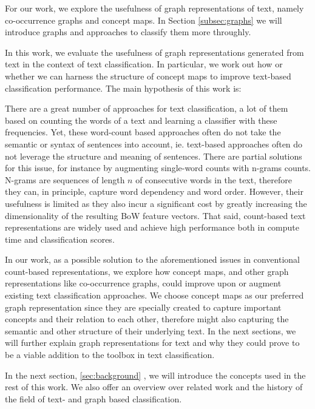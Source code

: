For our work, we explore the usefulness of graph representations of text, namely co-occurrence graphs and concept maps.
In Section \ref{subsec:graphs} we will introduce graphs and approaches to classify them more throughly.

In this work, we evaluate the usefulness of graph representations generated from text in the context of text classification. In particular, we work out how or whether we can harness the structure of concept maps to improve text-based classification performance.
The main hypothesis of this work is:
\begin{quote}
\hypothesis
\end{quote}

There are a great number of approaches for text classification, a lot of them based on counting the words of a text and learning a classifier with these frequencies.
Yet, these word-count based approaches often do not take the semantic or syntax of sentences into account, ie. text-based approaches often do not leverage the structure and meaning of sentences.
There are partial solutions for this issue, for instance by augmenting single-word counts with n-grams \cite[p.~191]{Manning2000} counts.
N-grams are sequences of length $n$ of consecutive words in the text, therefore they can, in principle, capture word dependency and word order.
However, their usefulness is limited as they also incur a significant cost by greatly increasing the dimensionality of the resulting BoW feature vectors.
That said, count-based text representations are widely used and achieve high performance both in compute time and classification scores.

In our work, as a possible solution to the aforementioned issues in conventional count-based representations, we explore how concept maps, and other graph representations like co-occurrence graphs, could improve upon or augment existing text classification approaches.
We choose concept maps as our preferred graph representation since they are specially created to capture important concepts and their relation to each other, therefore might also capturing the semantic and other structure of their underlying text.
In the next sections, we will further explain graph representations for text and why they could prove to be a viable addition to the toolbox in text classification.

In the next section, \ref{sec:background} , we will introduce the concepts used in the rest of this work.
We also offer an overview over related work and the history of the field of text- and graph based classification.

